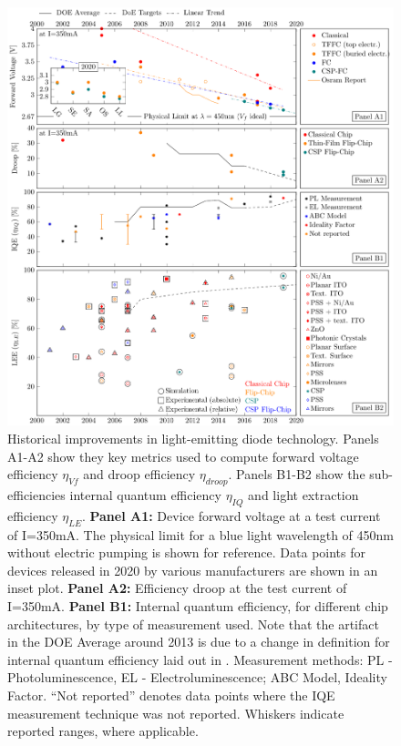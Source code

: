 \documentclass[twoside,twocolumn,9pt]{article}
\begin{document}
\begin{figure}[h!]
 \centering
 \includegraphics[width=17.5cm]{2_SSL_EES/article/figures/subefficiencies_progress.pdf}
 \caption{Historical improvements in light-emitting diode technology. Panels A1-A2 show they key metrics used to compute forward voltage efficiency $\eta_{Vf}$ and droop efficiency $\eta_{droop}$. Panels B1-B2 show the sub-efficiencies internal quantum efficiency $\eta_{IQ}$ and light extraction efficiency $\eta_{LE}$. \newline
 \textbf{Panel A1:} Device forward voltage at a test current of I=350mA. The physical limit for a blue light wavelength of 450nm without electric pumping is shown for reference. Data points for devices released in 2020 by various manufacturers are shown in an inset plot.
 \textbf{Panel A2:} Efficiency droop at the test current of I=350mA.
 \textbf{Panel B1:} Internal quantum efficiency, for different chip architectures, by type of measurement used. Note that the artifact in the DOE Average around 2013 is due to a change in definition for internal quantum efficiency laid out in \cite{doe_ssl_multiyear_2013}. Measurement methods: PL - Photoluminescence\cite{Shim_2018}, EL - Electroluminescence\cite{Getty_2009};  ABC Model\cite{Karpov_2014}, Ideality Factor\cite{Masui_2010}. “Not reported” denotes data points where the IQE measurement technique was not reported. Whiskers indicate reported ranges, where applicable.
}
\end{figure}
\end{document}
